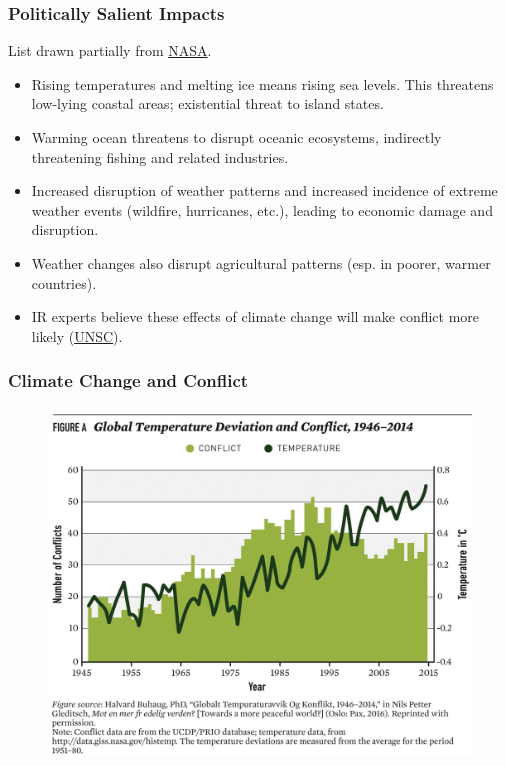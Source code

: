 \documentclass{beamer}
\begin{document}
\begin{frame} 
	\frametitle{\LARGE{Politically Salient Impacts}}
	List drawn partially from \href{https://climate.nasa.gov/evidence/}{NASA}.
	\begin{itemize}
		\item Rising temperatures and melting ice means rising sea levels. This threatens low-lying coastal areas; existential threat to island states. \pause
		\item Warming ocean threatens to disrupt oceanic ecosystems, indirectly threatening fishing and related industries. \pause
		\item Increased disruption of weather patterns and increased incidence of extreme weather events (wildfire, hurricanes, etc.), leading to economic damage and disruption.
		\item Weather changes also disrupt agricultural patterns (esp. in poorer, warmer countries). \pause
		\item IR experts believe these effects of climate change will make conflict more likely (\href{https://www.un.org/peacebuilding/fr/news/climate-change-recognized-\%E2\%80\%98threat-multiplier\%E2\%80\%99-un-security-council-debates-its-impact-peace}{UNSC}). 
	\end{itemize}
\end{frame}

\begin{frame} 
	\frametitle{\LARGE{Climate Change and Conflict}}
	\begin{figure}[ht!]
		\centering
		\includegraphics[width=\textwidth,height=0.9\textheight, keepaspectratio]{conflict.jpg}
	\end{figure}
\end{frame}
\end{document}
